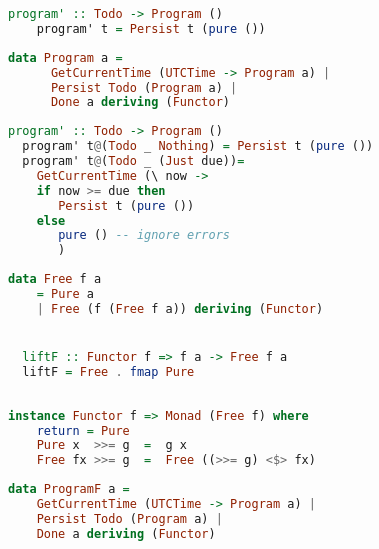 \documentclass[10pt]{beamer}
\begin{document}
\begin{frame}[fragile]
  \begin{lstlisting}[language=haskell]
    program' :: Todo -> Program ()
    program' t = Persist t (pure ())
  \end{lstlisting}
\end{frame}



\begin{frame}[fragile]
  \begin{lstlisting}[language=haskell]
    data Program a =
      GetCurrentTime (UTCTime -> Program a) |
      Persist Todo (Program a) |
      Done a deriving (Functor)
  \end{lstlisting}
\end{frame}


\begin{frame}[fragile]
  \begin{lstlisting}[language=haskell]
  program' :: Todo -> Program ()
  program' t@(Todo _ Nothing) = Persist t (pure ())
  program' t@(Todo _ (Just due))=
    GetCurrentTime (\ now ->
    if now >= due then
       Persist t (pure ())
    else
       pure () -- ignore errors
       )
  \end{lstlisting}
\end{frame}

\begin{frame}[fragile]
  \begin{lstlisting}[language=haskell]
  data Free f a
    = Pure a
    | Free (f (Free f a)) deriving (Functor)


  liftF :: Functor f => f a -> Free f a
  liftF = Free . fmap Pure
    
  \end{lstlisting}
\end{frame}

\begin{frame}[fragile]
  \begin{lstlisting}[language=haskell]
  instance Functor f => Monad (Free f) where
    return = Pure
    Pure x  >>= g  =  g x
    Free fx >>= g  =  Free ((>>= g) <$> fx)
  \end{lstlisting}
\end{frame}

\begin{frame}[fragile]
  \begin{lstlisting}[language=haskell]
  data ProgramF a =
    GetCurrentTime (UTCTime -> Program a) |
    Persist Todo (Program a) |
    Done a deriving (Functor)
  \end{lstlisting}
\end{frame}
\end{document}
